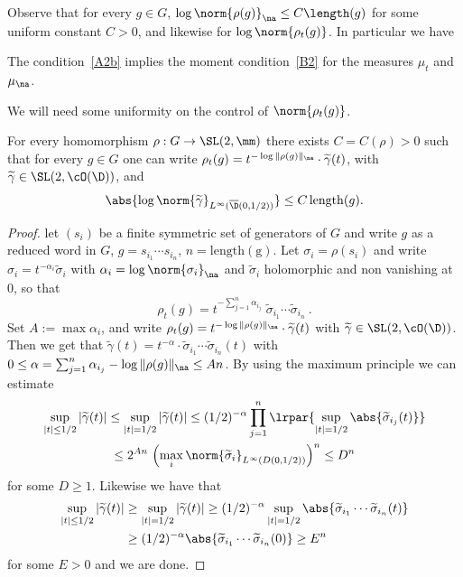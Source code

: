Observe that for every $g\in G$, $\log \norm{\rho(g)}_\na\leq C \length (g)$ for some uniform constant $C>0$, and likewise for $\log\norm{\rho_t(g)}$. In particular we have

\begin{lemm}\label{lem:AtoB}
The condition~\eqref{A2b} implies the moment condition~\eqref{B2} for the measures $\mu_t$ and $\mu_\na$.
\end{lemm}

We will need some uniformity on the control of $\norm{\rho_t(g)}$.

\begin{lemm}\label{lem:uniform disk}
For every homomorphism $\rho: G\to \SL(2, \mm)$ there exists $C = C(\rho)>0$ such that for every $g\in G$ one can write $\rho_t(g) = t^{-\log\|\rho(g) \|_\na}\cdot \widetilde{\gamma}(t)$, with $\widetilde{\gamma}\in \SL(2,\cO(\D))$, and
\begin{equation}\label{eq:uniform disk}
\abs{\log\norm{\widetilde \gamma}_{L^{\infty}(\overline{\D}(0,1/2))} }\leq C\, \mathrm{length}(g).
\end{equation}
\end{lemm}

\begin{proof}
let $(s_i)$ be a finite symmetric set of generators of $G$ and write $g$ as a reduced word in $G$, $g = s_{i_1}\cdots s_{i_n}$, $n = \mathrm{length(g)}$. Let $\sigma_i = \rho(s_i)$ and write $\sigma_i = t^{-\alpha_i} \widetilde \sigma_i$ with $\alpha_i = \log\norm{\sigma_i}_\na$ and $\widetilde \sigma_i$ holomorphic and non vanishing at 0,
so that
\[
\rho_t(g)= t^{-\sum_{j=1}^n\alpha_{i_j}} \; \widetilde \sigma_{i_1}\cdots \widetilde \sigma_{i_n}~.
\]
Set $A:= \max \alpha_i$, and write $\rho_t(g) = t^{-\log\|\rho(g) \|_\na}\cdot \widetilde{\gamma}(t)$ with $\widetilde{\gamma} \in \SL(2, \cO(\D))$. Then we get that $\widetilde{\gamma}(t) = t^{-\alpha} \cdot \widetilde \sigma_{i_1}\cdots \widetilde \sigma_{i_n}(t)$ with $0\le \alpha = \sum_{j=1}^n\alpha_{i_j} - \log\|\rho(g) \|_\na \le An$. By using the maximum principle we can estimate
\begin{multline*}
\sup_{|t|\le1/2}|\widetilde{\gamma}(t)| \le \sup_{|t|=1/2} |\widetilde{\gamma}(t)| \le (1/2)^{-\alpha} \prod_{j=1}^n \lrpar {\sup_{|t|=1/2} \abs{\widetilde \sigma_{i_j}(t) }}\\
\le 2^{An} \, \left(\max_{i}\norm{ \widetilde \sigma_i}_{L^\infty(D(0, 1/2))} \right)^n\le D^n
\end{multline*}
for some $D\geq1$. Likewise we have that
\begin{align*}
\sup_{|t|\le1/2}|\widetilde{\gamma}(t)| &\ge \sup_{|t|=1/2} |\widetilde{\gamma}(t)|
\ge (1/2)^{-\alpha} \sup_{|t|=1/2} \abs{\widetilde \sigma_{i_1}\cdots \widetilde \sigma_{i_n}(t)}\\
&\ge (1/2)^{-\alpha} \abs{\widetilde \sigma_{i_1}\cdots \widetilde \sigma_{i_n}(0)} \ge E^n
\end{align*}
for some $E>0$ and we are done.
\end{proof}

